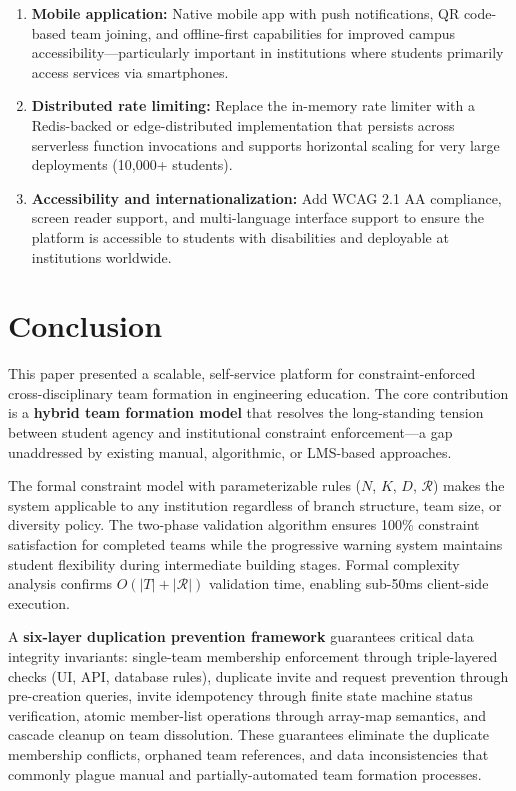 \documentclass[conference]{IEEEtran}
\begin{document}
\begin{enumerate}[noitemsep,topsep=3pt]
    \item \textbf{Mobile application:} Native mobile app with push notifications, QR code-based team joining, and offline-first capabilities for improved campus accessibility---particularly important in institutions where students primarily access services via smartphones.

    \item \textbf{Distributed rate limiting:} Replace the in-memory rate limiter with a Redis-backed or edge-distributed implementation that persists across serverless function invocations and supports horizontal scaling for very large deployments (10,000+ students).

    \item \textbf{Accessibility and internationalization:} Add WCAG 2.1 AA compliance, screen reader support, and multi-language interface support to ensure the platform is accessible to students with disabilities and deployable at institutions worldwide.
\end{enumerate}

\section{Conclusion}
\label{sec:conclusion}

This paper presented a scalable, self-service platform for constraint-enforced cross-disciplinary team formation in engineering education. The core contribution is a \textbf{hybrid team formation model} that resolves the long-standing tension between student agency and institutional constraint enforcement---a gap unaddressed by existing manual, algorithmic, or LMS-based approaches.

The formal constraint model with parameterizable rules ($N$, $K$, $D$, $\mathcal{R}$) makes the system applicable to any institution regardless of branch structure, team size, or diversity policy. The two-phase validation algorithm ensures 100\% constraint satisfaction for completed teams while the progressive warning system maintains student flexibility during intermediate building stages. Formal complexity analysis confirms $O(|T| + |\mathcal{R}|)$ validation time, enabling sub-50ms client-side execution.

A \textbf{six-layer duplication prevention framework} guarantees critical data integrity invariants: single-team membership enforcement through triple-layered checks (UI, API, database rules), duplicate invite and request prevention through pre-creation queries, invite idempotency through finite state machine status verification, atomic member-list operations through array-map semantics, and cascade cleanup on team dissolution. These guarantees eliminate the duplicate membership conflicts, orphaned team references, and data inconsistencies that commonly plague manual and partially-automated team formation processes.
\end{document}
